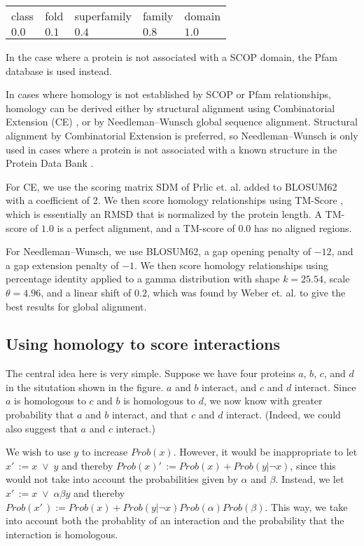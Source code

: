 \documentclass[12pt,twoside]{article}
\def\NI{\noindent}
\def\RS{
	\setlength{\itemsep}{0em}
	\setlength{\parskip}{0.4em}
	\setlength{\parsep}{0em}
}
\begin{document}
\begin{tabular}{lllll}
class & fold & superfamily & family & domain \\
$0.0$ & $0.1$ & $0.4$ & $0.8$ & $1.0$ \\
\end{tabular}

\NI In the case where a protein is not associated with a SCOP domain, the Pfam database is used instead. \RS
\NI In cases where homology is not established by SCOP \cite{scop} or Pfam relationships, homology can be derived either by structural alignment using Combinatorial Extension (CE) \cite{ce}, or by Needleman--Wunsch \cite{needleman} global sequence alignment. Structural alignment by Combinatorial Extension is preferred, so Needleman--Wunsch is only used in cases where a protein is not associated with a known structure in the Protein Data Bank \cite{pdb}.

\NI For CE, we use the scoring matrix SDM of Prlic et. al. \cite{prlic} added to BLOSUM62 \cite{blosum} with a coefficient of 2. We then score homology relationships using TM-Score \cite{zhang}, which is essentially an RMSD that is normalized by the protein length. A TM-score of $1.0$ is a perfect alignment, and a TM-score of $0.0$ has no aligned regions.

\NI For Needleman--Wunsch, we use BLOSUM62, a gap opening penalty of $-12$, and a gap extension penalty of $-1$. We then score homology relationships using percentage identity applied to a gamma distribution with shape $k=25.54$, scale $\theta=4.96$, and a linear shift of $0.2$, which was found by Weber et. al. \cite{webber} to give the best results for global alignment.

\subsection{Using homology to score interactions}

\NI The central idea here is very simple. Suppose we have four proteins $a$, $b$, $c$, and $d$ in the situtation shown in the figure. $a$ and $b$ interact, and $c$ and $d$ interact. Since $a$ is homologous to $c$ and $b$ is homologous to $d$, we now know with greater probability that $a$ and $b$ interact, and that $c$ and $d$ interact. (Indeed, we could also suggest that $a$ and $c$ interact.)

\NI We wish to use $y$ to increase $Prob(x)$. However, it would be inappropriate to let $x'\,\! := x \; \vee \; y$ and thereby $Prob(x)'\,\! := Prob(x) + Prob(y|\neg x)$, since this would not take into account the probabilities given by $\alpha$ and $\beta$. Instead, we let $x'\,\! := x \; \vee \; \alpha \beta y$ and thereby $Prob(x'\,\!) := Prob(x) + Prob(y | \neg x) Prob(\alpha) Prob(\beta)$. This way, we take into account both the probablity of an interaction and the probability that the interaction is homologous.
\end{document}
